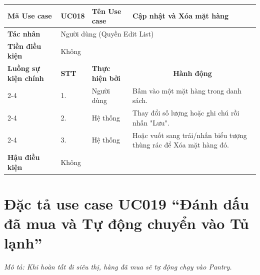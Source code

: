 \begin{longtable}{|p{2.7cm}|p{0.8cm}|p{2.6cm}|p{7.3cm}|}
\hline
\cellcolor[HTML]{D5F5E3}\textbf{Mã Use case} & \multicolumn{1}{l|}{UC018} & \cellcolor[HTML]{D5F5E3}\textbf{Tên Use case} & Cập nhật và Xóa mặt hàng \\ \hline
\cellcolor[HTML]{D5F5E3}\textbf{Tác nhân} & \multicolumn{3}{p{10.7cm}|}{Người dùng (Quyền Edit List)} \\ \hline
\cellcolor[HTML]{D5F5E3}\textbf{Tiền điều kiện} & \multicolumn{3}{p{10.7cm}|}{Không} \\ \hline

\cellcolor[HTML]{D5F5E3}\textbf{Luồng sự kiện chính} & \cellcolor[HTML]{FDEBD0}\textbf{STT} & \cellcolor[HTML]{FDEBD0}\textbf{Thực hiện bởi} & \multicolumn{1}{c|}{\cellcolor[HTML]{FDEBD0}\textbf{Hành động}} \\ \cline{2-4} 
\cellcolor[HTML]{D5F5E3} & 1. & Người dùng & Bấm vào một mặt hàng trong danh sách. \\ \cline{2-4} 
\cellcolor[HTML]{D5F5E3} & 2. & Hệ thống & Thay đổi số lượng hoặc ghi chú rồi nhấn "Lưu". \\ \cline{2-4} 
\cellcolor[HTML]{D5F5E3} & 3. & Hệ thống & Hoặc vuốt sang trái/nhấn biểu tượng thùng rác để Xóa mặt hàng đó. \\ \hline

\cellcolor[HTML]{D5F5E3}\textbf{Hậu điều kiện} & \multicolumn{3}{p{10.7cm}|}{Không} \\ \hline
\end{longtable}
\endgroup

\section{Đặc tả use case UC019 ``Đánh dấu đã mua và Tự động chuyển vào Tủ lạnh''}
\textit{Mô tả: Khi hoàn tất đi siêu thị, hàng đã mua sẽ tự động chạy vào Pantry.}
\vspace{0.5cm}

\begingroup
\renewcommand{\arraystretch}{1.5}

